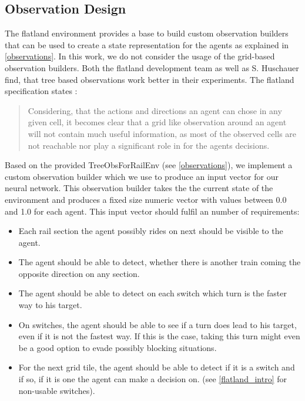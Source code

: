 \subsection*{Observation Design}\label{enhanced_observations}
The flatland environment provides a base to build custom observation builders that can be used to create a state representation for the agents as explained in \autoref{observations}. In this work, we do not consider the usage of the grid-based observation builders.
Both the flatland development team as well as S. Huschauer find, that tree based observations work better in their experiments. The flatland specification states \cite{flatland_spec}:
\begin{quote}
Considering, that the actions and directions an agent can chose in any given cell, it becomes clear that a grid like observation around an agent will not contain much useful information, as most of the observed cells are not reachable nor play a significant role in for the agents decisions.
\end{quote}
Based on the provided TreeObsForRailEnv (see \autoref{observations}), we implement a custom observation builder which we use to produce an input vector for our neural network. This observation builder takes the the current state of the environment and produces a fixed size numeric vector with values between 0.0 and 1.0 for each agent. This input vector should fulfil an number of requirements:
\begin{itemize}
	\item Each rail section the agent possibly rides on next should be visible to the agent.
	\item The agent should be able to detect, whether there is another train coming the opposite direction on any section.
	\item The agent should be able to detect on each switch which turn is the faster way to his target.
	\item On switches, the agent should be able to see if a turn does lead to his target, even if it is not the fastest way. If this is the case, taking this turn might even be a good option to evade possibly blocking situations.
	\item For the next grid tile, the agent should be able to detect if it is a switch and if so, if it is one the agent can make a decision on. (see \autoref{flatland_intro} for non-usable switches).
\end{itemize}


